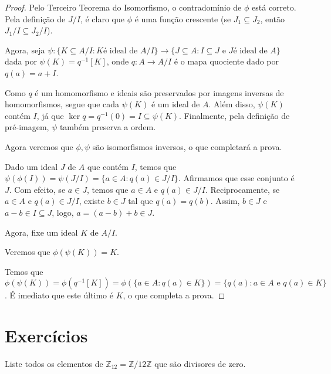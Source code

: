 \begin{proof}
    Pelo Terceiro Teorema do Isomorfismo, o contradomínio de $\phi$ está correto.
    Pela definição de $J/I$, é claro que $\phi$ é uma função crescente (se $J_1\subseteq J_2$, então $J_1/I\subseteq J_2/I$).

    Agora, seja $\psi:\{K\subseteq A/I: K \text{é ideal de } A/I\}\rightarrow \{J\subseteq A: I\subseteq J \text{ e } J \text{é ideal de } A\}$ dada por $\psi(K)=q^{-1}[K]$, onde $q:A\rightarrow A/I$ é o mapa quociente dado por $q(a)=a+I$.

    Como $q$ é um homomorfismo e ideais são preservados por imagens inversas de homomorfismos, segue que cada $\psi(K)$ é um ideal de $A$.
    Além disso, $\psi(K)$ contém $I$, já que $\ker q=q^{-1}(0)=I\subseteq \psi(K)$.
    Finalmente, pela definição de pré-imagem, $\psi$ também preserva a ordem.

    Agora veremos que $\phi, \psi$ são isomorfismos inversos, o que completará a prova.

    Dado um ideal $J$ de $A$ que contém $I$, temos que $\psi(\phi(I))=\psi(J/I)=\{a \in A: q(a)\in J/I\}$.
    Afirmamos que esse conjunto é $J$.
    Com efeito, se $a \in J$, temos que $a \in A$ e $q(a)\in J/I$.
    Reciprocamente, se $a \in A$ e $q(a) \in J/I$, existe $b \in J$ tal que $q(a)=q(b)$.
    Assim, $b \in J$ e $a-b \in I\subseteq J$, logo, $a=(a-b)+b\in J$.

    Agora, fixe um ideal $K$ de $A/I$.
    
    Veremos que $\phi(\psi(K))=K$.

    Temos que $\phi(\psi(K))=\phi(q^{-1}[K])=\phi(\{a \in A: q(a)\in K\})=\{q(a): a \in A \text{ e } q(a) \in K\}$.
    É imediato que este último é $K$, o que completa a prova.
\end{proof}

\section{Exercícios}

\begin{exer}
    Liste todos os elementos de $\mathbb Z_{12}=\mathbb Z/12\mathbb Z$ que são divisores de zero.
\end{exer}